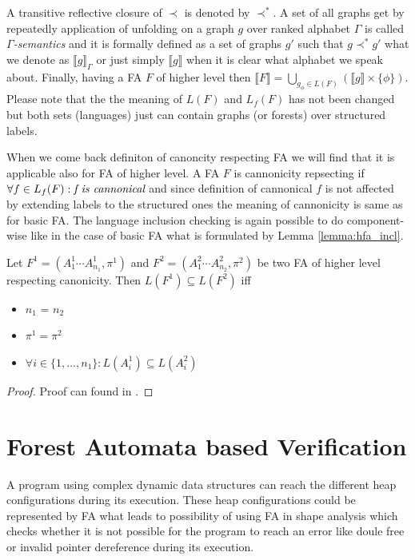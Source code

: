 A transitive reflective closure of $\prec$ is denoted by $\prec^*$.
A set of all graphs get by repeatedly application of unfolding on a graph $g$ over ranked alphabet $\Gamma$ is called
\emph{$\Gamma$-semantics} and it is formally defined as a set of graphs $g'$ such that $g \prec^* g'$
what we denote as $\llbracket g \rrbracket_\Gamma$ or just simply $\llbracket g \rrbracket$ when it is
clear what alphabet we speak about.
Finally, having a FA $F$ of higher level then $\llbracket F \rrbracket = \bigcup_{g_\phi \in L(F)} (\llbracket g \rrbracket \times \{\phi\})$.
Please note that the the meaning of $L(F)$ and $L_f(F)$ has not been changed but both sets (languages) just can contain graphs (or forests)
over structured labels.

When we come back definiton of canoncity respecting FA we will find that it is applicable also for FA of higher level.
A FA $F$ is cannonicity repsecting if $\forall f \in L_f(F): \emph{f is cannonical}$ and since definition of cannonical $f$
is not affected by extending labels to the structured ones the meaning of cannonicity is same as for basic FA.
The language inclusion checking is again possible to do component-wise like in the case of basic FA what is
formulated by Lemma \ref{lemma:hfa_incl}.

\begin{lemma}
	Let $F^1 = (A_1^1\cdots A_{n_1}^1, \pi^1)$ and $F^2 = (A_1^2\cdots A_{n_2}^2, \pi^2)$
	be two FA of higher level respecting canonicity.
	Then $L(F^1) \subseteq L(F^2)$ iff
	\begin{itemize}
			\item $n_1$ = $n_2$
			\item $\pi^1 = \pi^2$
			\item $\forall i \in \{1,\ldots,n_1\}: L(A_i^1) \subseteq L(A_i^2)$
	\end{itemize}
\end{lemma}
\begin{proof}
	Proof can found in \cite{cav11tr}.
\end{proof}


\chapter{Forest Automata based Verification}
\label{ch:fav}

A program using complex dynamic data structures can reach the different heap configurations
during its execution.
These heap configurations could be represented by FA what leads to possibility
of using FA in shape analysis which checks whether it is not possible for the program to reach an error like doule free or
invalid pointer dereference during its execution.

